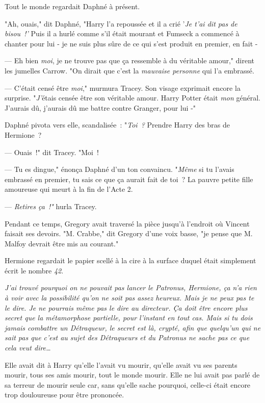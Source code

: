 Tout le monde regardait Daphné à présent.

"Ah, ouais," dit Daphné, "Harry l'a repoussée et il a crié '\emph{Je t'ai dit pas de bisou~!'} Puis il a hurlé comme s'il était mourant et Fumseck a commencé à chanter pour lui - je ne suis plus sûre de ce qui s'est produit en premier, en fait -

--- Eh bien \emph{moi}, je ne trouve pas que ça ressemble à du véritable amour," dirent les jumelles Carrow. "On dirait que c'est la \emph{mauvaise personne} qui l'a embrassé.

--- C'était censé être \emph{moi}," murmura Tracey. Son visage exprimait encore la surprise. "\emph{J'}étais censée être son véritable amour. Harry Potter était \emph{mon} général. J'aurais dû, j'aurais dû me battre contre Granger, pour lui -"

Daphné pivota vers elle, scandalisée~: "\emph{Toi~?} Prendre Harry des bras de Hermione~?

--- Ouais~!" dit Tracey. "Moi~!

--- Tu es dingue," énonça Daphné d'un ton convaincu. "\emph{Même} si tu l'avais embrassé en premier, tu sais ce que ça aurait fait de toi~? La pauvre petite fille amoureuse qui meurt à la fin de l'Acte 2.

--- \emph{Retires ça~!"} hurla Tracey.

Pendant ce temps, Gregory avait traversé la pièce jusqu'à l'endroit où Vincent faisait ses devoirs. "M. Crabbe," dit Gregory d'une voix basse, "je pense que M. Malfoy devrait être mis au courant."


Hermione regardait le papier scellé à la cire à la surface duquel était simplement écrit le nombre \emph{42}.

\emph{J'ai trouvé pourquoi on ne pouvait pas lancer le Patronus, Hermione, ça n'a rien à voir avec la possibilité qu'on ne soit pas assez heureux. Mais je ne peux pas te le dire. Je ne pourrais même pas le dire au directeur. Ça doit être encore plus secret que la métamorphose partielle, pour l'instant en tout cas. Mais si tu dois jamais combattre un Détraqueur, le secret est là, crypté, afin que quelqu'un qui ne sait pas que c'est au sujet des Détraqueurs et du Patronus ne sache pas ce que cela veut dire…}

Elle avait dit à Harry qu'elle l'avait vu mourir, qu'elle avait vu ses parents mourir, tous ses amis mourir, tout le monde mourir. Elle ne lui avait pas parlé de sa terreur de mourir seule car, sans qu'elle sache pourquoi, celle-ci était encore trop douloureuse pour être prononcée.

